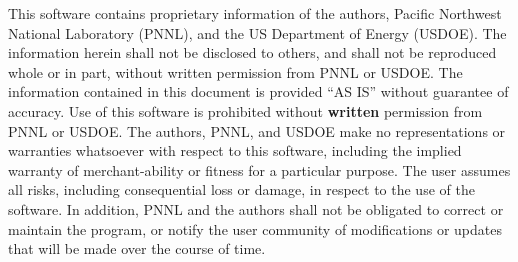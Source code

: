 This software contains proprietary information of the authors, Pacific
Northwest National Laboratory (PNNL), and the US Department of Energy (USDOE).
The information herein shall not be disclosed to others, and shall not
be reproduced whole or in part, without written permission from PNNL or
USDOE.  The information contained in this document is provided ``AS
IS'' without guarantee of accuracy.  Use of this software is
prohibited without {\bf written} permission from PNNL or USDOE.  The
authors, PNNL, and USDOE make no representations or warranties
whatsoever with respect to this software, including the implied
warranty of merchant-ability or fitness for a particular purpose.  The
user assumes all risks, including consequential loss or damage, in
respect to the use of the software.  In addition, PNNL and the authors
shall not be obligated to correct or maintain the program, or notify
the user community of modifications or updates that will be made over
the course of time.
